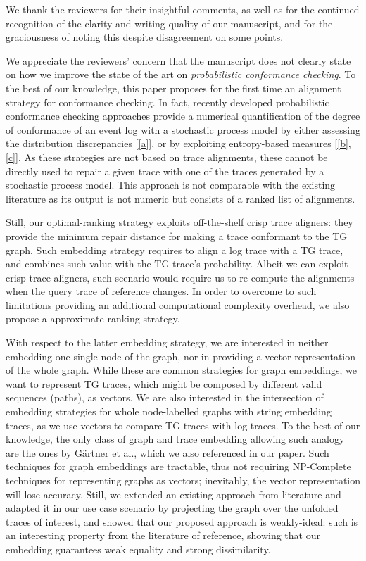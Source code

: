 \documentclass{article}
\begin{document}
We thank the reviewers for their insightful comments, as well as for the continued recognition of the clarity and writing quality of our manuscript, and for the graciousness of noting this despite disagreement on some points.



We appreciate the reviewers' concern that the manuscript does not clearly state on how we improve the state of the art on \textit{probabilistic conformance checking}. To the best of our knowledge, this paper proposes for the first time an alignment strategy for conformance checking. In fact, recently developed probabilistic conformance checking approaches
provide a numerical quantification of the degree of conformance of an event log
with a stochastic process model by either assessing the distribution discrepancies
[\ref{a}], or by exploiting entropy-based measures [\ref{b},\ref{c}]. As these strategies are not
 based on trace alignments, these cannot be directly used to repair a given trace
with one of the traces generated by a stochastic process model.
 This approach is not
comparable with the existing literature as
its output is not numeric but consists of a ranked list of alignments.

Still, our optimal-ranking strategy exploits  off-the-shelf crisp trace aligners: they provide the minimum repair distance for making a trace conformant to the TG graph. Such embedding strategy requires to align a log trace with a TG trace, and combines such value with the TG trace's probability. Albeit we can exploit crisp trace aligners, such scenario would require us to re-compute the alignments when the query trace of reference changes. In order to overcome to such limitations providing an additional computational complexity overhead, we also propose a approximate-ranking strategy.


With respect to the latter embedding strategy, we are interested in neither embedding one single node of the graph, nor in providing a vector representation of the whole graph. While these are common strategies for graph embeddings, we want to represent TG traces, which might be composed by different valid sequences (paths), as vectors. We are also interested in the intersection of embedding strategies for whole node-labelled graphs with string embedding traces, as we use vectors to compare TG traces with log traces. To the best of our knowledge, the only class of graph and trace embedding allowing such analogy are the ones by Gärtner et al., which we also referenced in our paper. Such techniques for graph embeddings are tractable, thus not requiring NP-Complete techniques for representing graphs as vectors; inevitably, the vector representation will lose accuracy. Still, we extended an existing approach from literature and adapted it in our use case scenario by projecting the graph over the unfolded traces of interest, and showed that our proposed approach is weakly-ideal: such is an interesting property from the literature of reference, showing that our embedding guarantees weak equality and strong dissimilarity. 
\end{document}
